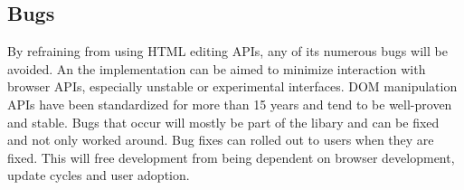 \subsection{Bugs} %

By refraining from using HTML editing APIs, any of its numerous bugs will be avoided. An the implementation can be aimed to minimize interaction with browser APIs, especially unstable or experimental interfaces. DOM manipulation APIs have been standardized for more than 15 years and tend to be well-proven and stable. Bugs that occur will mostly be part of the libary and can be fixed and not only worked around. Bug fixes can rolled out to users when they are fixed. This will free development from being dependent on browser development, update cycles and user adoption. 






